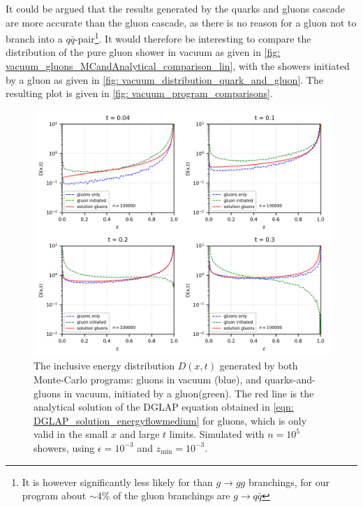 \documentclass[main.tex]{subfiles}
\begin{document}
It could be argued that the results generated by the quarks and gluons cascade are more accurate than the gluon cascade, as there is no reason for a gluon not to branch into a \(q\bar q\)-pair\footnote{It is however significantly less likely for than \(g\rightarrow gg\) branchings, for our program about \(\sim 4\%\) of the gluon branchings are \(g\rightarrow q\bar q\)}. It would therefore be interesting to compare the distribution of the pure gluon shower in vacuum as given in \autoref{fig: vacuum_gluons_MCandAnalytical_comparison_lin}, with the showers initiated by a gluon as given in \autoref{fig: vacuum_distribution_quark_and_gluon}. The resulting plot is given in \autoref{fig: vacuum_program_comparisons}.
\begin{figure}[htb]
    \centering
    \includegraphics[width=13cm]{pictures/plots/distributions/program_comparison/comparison_vacuum_programs_100k_lin.png}
    \caption{The inclusive energy distribution \(D(x,t)\) generated by both Monte-Carlo programs: gluons in vacuum (blue), and quarks-and-gluons in vacuum, initiated by a gluon(green). The red line is the analytical solution of the DGLAP equation obtained in \autoref{eqn: DGLAP_solution_energyflowmedium} for gluons, which is only valid in the small \(x\) and large \(t\) limits. Simulated with \(n = 10^5\) showers, using \(\epsilon=10^{-3}\) and \(z_{\text{min}}=10^{-3}\).}
    \label{fig: vacuum_program_comparisons}
\end{figure}
\end{document}
